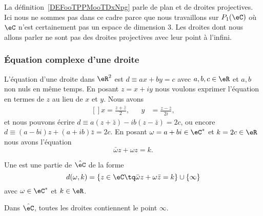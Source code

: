 \begin{remark}
	La définition~\ref{DEFooTPPMooTDxNpg} parle de plan et de droites projectives. Ici nous ne sommes pas dans ce cadre parce que nous travaillons sur \( P_1(\eC)\) où \( \eC\) n'est certainement pas un espace de dimension \( 3\). Les droites dont nous allons parler ne sont pas des droites projectives avec leur point à l'infini.
\end{remark}

\subsubsection{Équation complexe d'une droite}

L'équation d'une droite dans \( \eR^2\) est \( d\equiv ax+by=c\) avec \( a,b,c\in \eR\) et \( a,b\) non nuls en même temps. En posant \( z=x+iy\) nous voulons exprimer l'équation en termes de \( z\) au lieu de \( x\) et \( y\). Nous avons\cite{ooWNHWooGUnivi}
\begin{equation}
	\begin{aligned}[]
		x=\frac{ z+\bar z }{2}, &  & y & =\frac{ z-\bar z }{ 2i },
	\end{aligned}
\end{equation}
et nous pouvons écrire \( d\equiv a(z+\bar z)-ib(z-\bar z)=2c\), ou encore \( d\equiv (a-bi)z+(a+ib)\bar z=2c\). En posant \( \omega=a+bi\in \eC^*\) et \( k=2c\in \eR\) nous avons l'équation
\begin{equation}        \label{EQooPRCPooVvrHME}
	\bar \omega z+\omega z=k.
\end{equation}

\begin{definition}      \label{DEFooAQSMooWNOzAI}
	Une  est une partie de \( \hat\eC\) de la forme
	\begin{equation}
		d(\omega,k)=\{ z\in \eC\tq \bar\omega z+\omega\bar z=k \}\cup\{ \infty \}
	\end{equation}
	avec \( \omega\in \eC^*\) et \( k\in \eR\).
\end{definition}
Dans \( \hat \eC\), toutes les droites contiennent le point \( \infty\).

